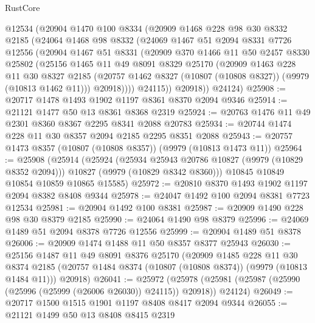 \begin{lexlean}{RustCore}
\begin{coremodule}
      @12534
      (@20904
        @1470
        @100
        @8334
        (@20909
          @1468
          @228
          @98
          @30
          @8332
          @2185
          (@24064
            @1468
            @98
            @8332
            (@24069
              @1467
              @51
              @2094
              @8331
              @7726
              @12556
              (@20904
                @1467
                @51
                @8331
                (@20909
                  @370
                  @1466
                  @11
                  @50
                  @2457
                  @8330
                  @25802
                  (@25156
                    @1465
                    @11
                    @49
                    @8091
                    @8329
                    @25170
                    (@20909
                      @1463
                      @228
                      @11
                      @30
                      @8327
                      @2185
                      (@20757 @1462 @8327 (@10807 (@10808 @8327)) (@9979 (@10813 @1462 @11)))
                      @20918))))
              @24115))
          @20918))
      @24124)
@25908 := @20717 @1478 @1493 @1902 @1197 @8361 @8370 @2094 @9346
@25914 := @21121 @1477 @50 @13 @8361 @8368 @2319
@25924 := @20763 @1476 @11 @49 @2301 @8360 @8367 @2295 @8341 @2088 @20783
@25934 := @20744 @1474 @228 @11 @30 @8357 @2094 @2185 @2295 @8351 @2088
@25943 := @20757 @1473 @8357 (@10807 (@10808 @8357)) (@9979 (@10813 @1473 @11))
@25964 := @25908
    (@25914
      (@25924
        (@25934 @25943 @20786 @10827 (@9979 (@10829 @8352 @2094)))
        @10827
        (@9979 (@10829 @8342 @8360)))
      @10845
      @10849
      @10854
      @10859
      @10865
      @15585)
@25972 := @20810 @8370 @1493 @1902 @1197 @2094 @8382 @8408 @9344
@25978 := @24047 @1492 @100 @2094 @8381 @7723 @12534
@25981 := @20904 @1492 @100 @8381
@25987 := @20909 @1490 @228 @98 @30 @8379 @2185
@25990 := @24064 @1490 @98 @8379
@25996 := @24069 @1489 @51 @2094 @8378 @7726 @12556
@25999 := @20904 @1489 @51 @8378
@26006 := @20909 @1474 @1488 @11 @50 @8357 @8377 @25943
@26030 := @25156
    @1487
    @11
    @49
    @8091
    @8376
    @25170
    (@20909
      @1485
      @228
      @11
      @30
      @8374
      @2185
      (@20757 @1484 @8374 (@10807 (@10808 @8374)) (@9979 (@10813 @1484 @11)))
      @20918)
@26041 := @25972
    (@25978 (@25981 (@25987 (@25990 (@25996 (@25999 (@26006 @26030)) @24115)) @20918)) @24124)
@26049 := @20717 @1500 @1515 @1901 @1197 @8408 @8417 @2094 @9344
@26055 := @21121 @1499 @50 @13 @8408 @8415 @2319

\end{coremodule}
\end{lexlean}
